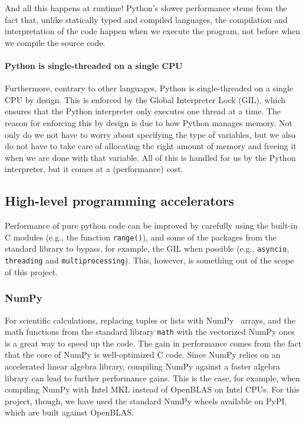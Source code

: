 \documentclass[12pt]{article}
\begin{document}
And all this happens at runtime! Python's slower performance stems from the fact that, unlike statically typed and compiled languages, the compilation and interpretation of the code happen when we execute the program, not before when we compile the source code.

\paragraph{Python is single-threaded on a single CPU} Furthermore, contrary to other languages, Python is single-threaded on a single CPU by design. This is enforced by the Global Interpreter Lock (GIL), which ensures that the Python interpreter only executes one thread at a time. The reason for enforcing this by design is due to how Python manages memory. Not only do we not have to worry about specifying the type of variables, but we also do not have to take care of allocating the right amount of memory and freeing it when we are done with that variable. All of this is handled for us by the Python interpreter, but it comes at a (performance) cost.

\subsection{High-level programming accelerators}

Performance of pure python code can be improved by carefully using the built-in C modules (e.g., the function \texttt{range()}), and some of the packages from the standard library to bypass, for example, the GIL when possible (e.g., \texttt{asyncio}, \texttt{threading} and \texttt{multiprocessing}). This, however, is something out of the scope of this project.

\subsubsection{NumPy}

For scientific calculations, replacing tuples or lists with NumPy~\cite{NumPy} arrays, and the math functions from the standard library \texttt{math} with the vectorized NumPy ones is a great way to speed up the code. The gain in performance comes from the fact that the core of NumPy is well-optimized C code. Since NumPy relies on an accelerated linear algebra library, compiling NumPy against a faster algebra library can lead to further performance gains. This is the case, for example, when compiling NumPy with Intel MKL instead of OpenBLAS on Intel CPUs. For this project, though, we have used the standard NumPy wheels available on PyPI, which are built against OpenBLAS.
\end{document}
